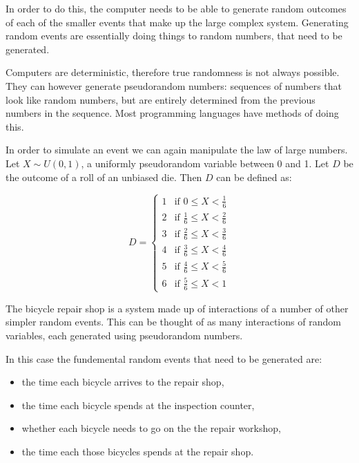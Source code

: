 In order to do this, the computer needs to be able to generate random outcomes
of each of the smaller events that make up the large complex system. Generating
random events are essentially doing things to random numbers, that need to be
generated.

Computers are deterministic, therefore true randomness is not always possible.
They can however generate pseudorandom numbers: sequences of numbers that look
like random numbers, but are entirely determined from the
previous numbers in the sequence. Most programming languages have methods of
doing this.

In order to simulate an event we can again manipulate the law of large numbers.
Let $X \sim U(0, 1)$, a uniformly pseudorandom variable between 0 and 1.
Let $D$ be the outcome of a roll of an unbiased die. Then $D$ can be defined as:

\begin{equation}
D =
  \begin{cases}
    1 & \text{if } 0 \leq X < \frac{1}{6}\\
    2 & \text{if } \frac{1}{6} \leq X < \frac{2}{6}\\
    3 & \text{if } \frac{2}{6} \leq X < \frac{3}{6}\\
    4 & \text{if } \frac{3}{6} \leq X < \frac{4}{6}\\
    5 & \text{if } \frac{4}{6} \leq X < \frac{5}{6}\\
    6 & \text{if } \frac{5}{6} \leq X < 1
  \end{cases}
\end{equation}

The bicycle repair shop is a system made up of interactions of a number of other
simpler random events. This can be thought of as many interactions of random
variables, each generated using pseudorandom numbers.

In this case the fundemental random events that need to be generated are:
\begin{itemize}
  \item the time each bicycle arrives to the repair shop,
  \item the time each bicycle spends at the inspection counter,
  \item whether each bicycle needs to go on the the repair workshop,
  \item the time each those bicycles spends at the repair shop.
\end{itemize}

